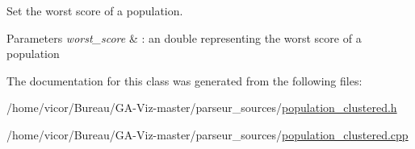 Set the worst score of a population. 


\begin{DoxyParams}{Parameters}
{\em worst\+\_\+score} & \+: an double representing the worst score of a population \\
\hline
\end{DoxyParams}


The documentation for this class was generated from the following files\+:\begin{DoxyCompactItemize}
\item 
/home/vicor/\+Bureau/\+G\+A-\/\+Viz-\/master/parseur\+\_\+sources/\hyperlink{population__clustered_8h}{population\+\_\+clustered.\+h}\item 
/home/vicor/\+Bureau/\+G\+A-\/\+Viz-\/master/parseur\+\_\+sources/\hyperlink{population__clustered_8cpp}{population\+\_\+clustered.\+cpp}\end{DoxyCompactItemize}
